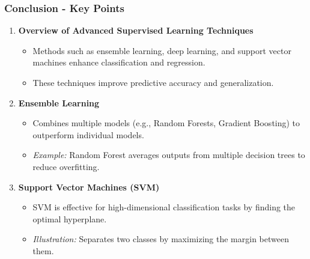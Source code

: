 \documentclass[aspectratio=169]{beamer}
\begin{document}
\begin{frame}[fragile]
    \frametitle{Conclusion - Key Points}
    \begin{enumerate}
        \item \textbf{Overview of Advanced Supervised Learning Techniques}
        \begin{itemize}
            \item Methods such as ensemble learning, deep learning, and support vector machines enhance classification and regression.
            \item These techniques improve predictive accuracy and generalization.
        \end{itemize}
        
        \item \textbf{Ensemble Learning}
        \begin{itemize}
            \item Combines multiple models (e.g., Random Forests, Gradient Boosting) to outperform individual models.
            \item \textit{Example:} Random Forest averages outputs from multiple decision trees to reduce overfitting.
        \end{itemize}
        
        \item \textbf{Support Vector Machines (SVM)}
        \begin{itemize}
            \item SVM is effective for high-dimensional classification tasks by finding the optimal hyperplane.
            \item \textit{Illustration:} Separates two classes by maximizing the margin between them.
        \end{itemize}
    \end{enumerate}
\end{frame}
\end{document}
